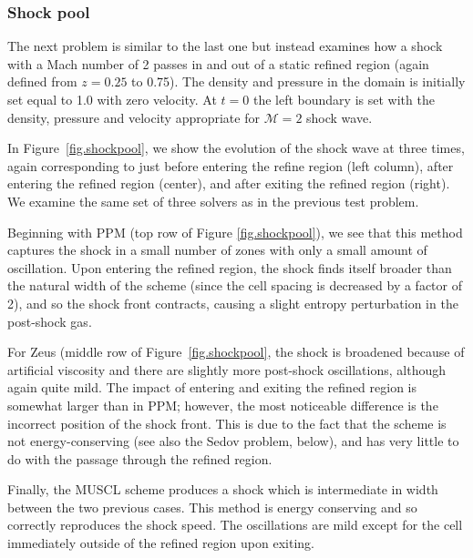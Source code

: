 \subsubsection{Shock pool}
\label{sec.tests.shockpool}

The next problem is similar to the last one but instead examines how a shock with a Mach number of 2 passes in and out of a static refined region (again defined from $z=0.25$ to 0.75).  The density and pressure in the domain is initially set equal to 1.0 with zero velocity.  At $t=0$ the left boundary is set with the density, pressure and velocity appropriate for $\mathcal{M}=2$ shock wave.

In Figure~\ref{fig.shockpool}, we show the evolution of the shock wave at three times, again corresponding to just before entering the refine region (left column), after entering the refined region (center), and after exiting the refined region (right).  We examine the same set of three solvers as in the previous test problem.

Beginning with PPM (top row of Figure \ref{fig.shockpool}), we see that this method captures the shock in a small number of zones with only a small amount of oscillation.  Upon entering the refined region, the shock finds itself broader than the natural width of the scheme (since the cell spacing is decreased by a factor of 2), and so the shock front contracts, causing a slight entropy perturbation in the post-shock gas. 

For Zeus (middle row of Figure~\ref{fig.shockpool}, the shock is broadened because of artificial viscosity and there are slightly more post-shock oscillations, although again quite mild.  The impact of entering and exiting the refined region is somewhat larger than in PPM; however, the most noticeable difference is the incorrect position of the shock front. This is due to the fact that the scheme is not energy-conserving (see also the Sedov problem, below), and has very little to do with the passage through the refined region.

Finally, the MUSCL scheme produces a shock which is intermediate in width between the two previous cases.  This method is energy conserving and so correctly reproduces the shock speed.  The oscillations are mild except for the cell immediately outside of the refined region upon exiting.


